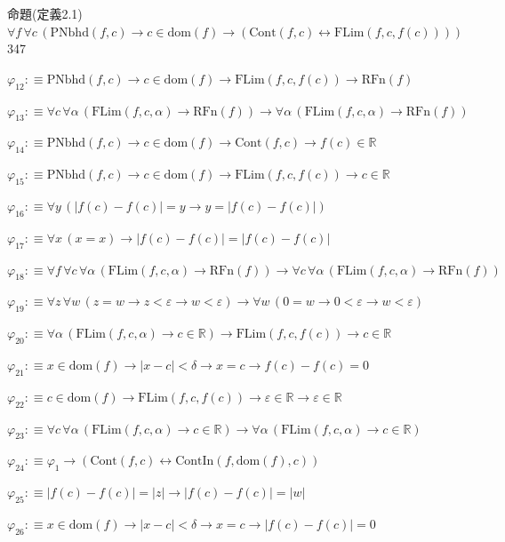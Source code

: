 \begin{fullproof}{命題(定義2.1)}{$\forall f\,\forall c\,(\mathrm{PNbhd}(f,c) \to c \in \mathrm{dom}(f) \to (\mathrm{Cont}(f,c) \leftrightarrow \mathrm{FLim}(f,c,f(c))))$}{347}
\begin{abbrevlist}
\item $\varphi_{12} :\equiv \mathrm{PNbhd}(f,c) \to c \in \mathrm{dom}(f) \to \mathrm{FLim}(f,c,f(c)) \to \mathrm{RFn}(f)$
\item $\varphi_{13} :\equiv \forall c\,\forall \alpha\,(\mathrm{FLim}(f,c,\alpha) \to \mathrm{RFn}(f)) \to \forall \alpha\,(\mathrm{FLim}(f,c,\alpha) \to \mathrm{RFn}(f))$
\item $\varphi_{14} :\equiv \mathrm{PNbhd}(f,c) \to c \in \mathrm{dom}(f) \to \mathrm{Cont}(f,c) \to f(c) \in \mathbb{R}$
\item $\varphi_{15} :\equiv \mathrm{PNbhd}(f,c) \to c \in \mathrm{dom}(f) \to \mathrm{FLim}(f,c,f(c)) \to c \in \mathbb{R}$
\item $\varphi_{16} :\equiv \forall y\,(\lvert f(c) - f(c) \rvert = y \to y = \lvert f(c) - f(c) \rvert)$
\item $\varphi_{17} :\equiv \forall x\,(x = x) \to \lvert f(c) - f(c) \rvert = \lvert f(c) - f(c) \rvert$
\item $\varphi_{18} :\equiv \forall f\,\forall c\,\forall \alpha\,(\mathrm{FLim}(f,c,\alpha) \to \mathrm{RFn}(f)) \to \forall c\,\forall \alpha\,(\mathrm{FLim}(f,c,\alpha) \to \mathrm{RFn}(f))$
\item $\varphi_{19} :\equiv \forall z\,\forall w\,(z = w \to z < \varepsilon \to w < \varepsilon) \to \forall w\,(0 = w \to 0 < \varepsilon \to w < \varepsilon)$
\item $\varphi_{20} :\equiv \forall \alpha\,(\mathrm{FLim}(f,c,\alpha) \to c \in \mathbb{R}) \to \mathrm{FLim}(f,c,f(c)) \to c \in \mathbb{R}$
\item $\varphi_{21} :\equiv x \in \mathrm{dom}(f) \to \lvert x - c \rvert < \delta \to x = c \to f(c) - f(c) = 0$
\item $\varphi_{22} :\equiv c \in \mathrm{dom}(f) \to \mathrm{FLim}(f,c,f(c)) \to \varepsilon \in \mathbb{R} \to \varepsilon \in \mathbb{R}$
\item $\varphi_{23} :\equiv \forall c\,\forall \alpha\,(\mathrm{FLim}(f,c,\alpha) \to c \in \mathbb{R}) \to \forall \alpha\,(\mathrm{FLim}(f,c,\alpha) \to c \in \mathbb{R})$
\item $\varphi_{24} :\equiv \varphi_{1} \to (\mathrm{Cont}(f,c) \leftrightarrow \mathrm{ContIn}(f,\mathrm{dom}(f),c))$
\item $\varphi_{25} :\equiv \lvert f(c) - f(c) \rvert = \lvert z \rvert \to \lvert f(c) - f(c) \rvert = \lvert w \rvert$
\item $\varphi_{26} :\equiv x \in \mathrm{dom}(f) \to \lvert x - c \rvert < \delta \to x = c \to \lvert f(c) - f(c) \rvert = 0$

\end{abbrevlist}
\end{fullproof}
